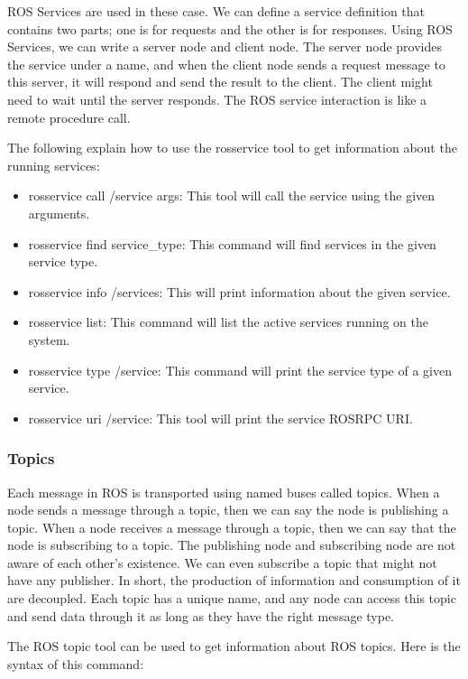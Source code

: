  	ROS Services are used in these case. We can define a service definition that contains two parts; one is for requests and the other is for responses. 
 	Using ROS Services, we can write a server node and client node. The server node provides the service under a name, and when the client node sends a request message to this server, it will respond and send the result to the client. The client might need to wait until the server responds. The ROS service interaction is like a remote procedure call.
 	
 	The following explain how to use the rosservice tool to get information about the running services:
 	
 	\begin{itemize}
 		\item rosservice call /service args: This tool will call the service using the given arguments.
 		\item rosservice find service\_type: This command will find services in the given service type.
 		\item rosservice info /services: This will print information about the given service.
 		\item rosservice list: This command will list the active services running on the system.
 		\item rosservice type /service: This command will print the service type of a given service.
 		\item rosservice uri /service: This tool will print the service ROSRPC URI.
 	\end{itemize}
 
 	\subsubsection{Topics}
 	Each message in ROS is transported using named buses called topics. When a node sends a message through a topic, then we can say the node is publishing a topic. When a node receives a message through a topic, then we can say that the node is subscribing to a topic. The publishing node and subscribing node are not aware of each other's existence. We can even subscribe a topic that might not have any publisher. In short, the production of information and consumption of it are decoupled. Each topic has a unique name, and any node can access this topic and send data through it as long as they have the right message type.
 	
 	The ROS topic tool can be used to get information about ROS topics. Here is the syntax of this command:
 	
